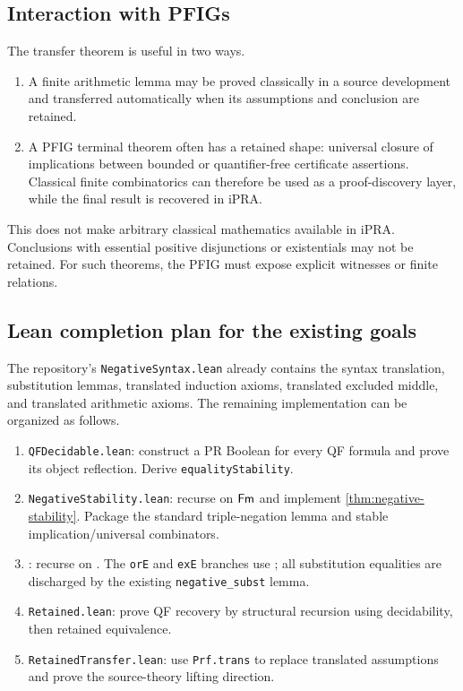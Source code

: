 \subsection{Interaction with PFIGs}

The transfer theorem is useful in two ways.

\begin{enumerate}
\item A finite arithmetic lemma may be proved classically in a source development and transferred automatically when its assumptions and conclusion are retained.
\item A PFIG terminal theorem often has a retained shape: universal closure of implications between bounded or quantifier-free certificate assertions.  Classical finite combinatorics can therefore be used as a proof-discovery layer, while the final result is recovered in iPRA.
\end{enumerate}

This does not make arbitrary classical mathematics available in iPRA.  Conclusions with essential positive disjunctions or existentials may not be retained.  For such theorems, the PFIG must expose explicit witnesses or finite relations.

\subsection{Lean completion plan for the existing goals}

The repository's \texttt{NegativeSyntax.lean} already contains the syntax translation, substitution lemmas, translated induction axioms, translated excluded middle, and translated arithmetic axioms.  The remaining implementation can be organized as follows.

\begin{enumerate}
\item \texttt{QFDecidable.lean}: construct a PR Boolean for every QF formula and prove its object reflection.  Derive \texttt{equalityStability}.
\item \texttt{NegativeStability.lean}: recurse on \(\mathsf{Fm}\) and implement \cref{thm:negative-stability}.  Package the standard triple-negation lemma and stable implication/universal combinators.
\item {}: recurse on .  The \texttt{orE} and \texttt{exE} branches use ; all substitution equalities are discharged by the existing \texttt{negative\_subst} lemma.
\item \texttt{Retained.lean}: prove QF recovery by structural recursion using decidability, then retained equivalence.
\item \texttt{RetainedTransfer.lean}: use \texttt{Prf.trans} to replace translated assumptions and prove the source-theory lifting direction.
\end{enumerate}


